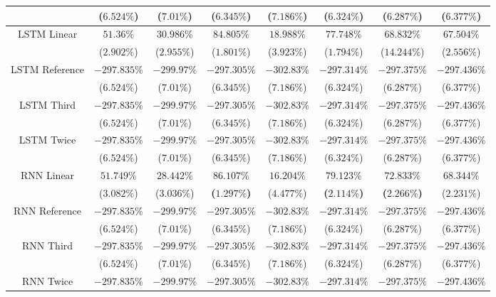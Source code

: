 \begin{table}[!ht]
{\begin{tabular}{|c|c|c|c|c|c|c|c|}
			 & ($6.524\%$) & ($7.01\%$) & ($6.345\%$) & ($7.186\%$) & ($6.324\%$) & ($6.287\%$) & ($6.377\%$) \\ \hline
			\multirow{2}{*}{LSTM Linear} & $51.36\%$ & $30.986\%$ & $84.805\%$ & $18.988\%$ & $77.748\%$ & $68.832\%$ & $67.504\%$ \\
			 & ($2.902\%$) & ($2.955\%$) & ($1.801\%$) & ($3.923\%$) & ($1.794\%$) & ($14.244\%$) & ($2.556\%$) \\ \hline
			\multirow{2}{*}{LSTM Reference} & $-297.835\%$ & $-299.97\%$ & $-297.305\%$ & $-302.83\%$ & $-297.314\%$ & $-297.375\%$ & $-297.436\%$ \\
			 & ($6.524\%$) & ($7.01\%$) & ($6.345\%$) & ($7.186\%$) & ($6.324\%$) & ($6.287\%$) & ($6.377\%$) \\ \hline
			\multirow{2}{*}{LSTM Third} & $-297.835\%$ & $-299.97\%$ & $-297.305\%$ & $-302.83\%$ & $-297.314\%$ & $-297.375\%$ & $-297.436\%$ \\
			 & ($6.524\%$) & ($7.01\%$) & ($6.345\%$) & ($7.186\%$) & ($6.324\%$) & ($6.287\%$) & ($6.377\%$) \\ \hline
			\multirow{2}{*}{LSTM Twice} & $-297.835\%$ & $-299.97\%$ & $-297.305\%$ & $-302.83\%$ & $-297.314\%$ & $-297.375\%$ & $-297.436\%$ \\
			 & ($6.524\%$) & ($7.01\%$) & ($6.345\%$) & ($7.186\%$) & ($6.324\%$) & ($6.287\%$) & ($6.377\%$) \\ \hline
			\multirow{2}{*}{RNN Linear} & $51.749\%$ & $28.442\%$ & $\mathbf{86.107\%}$ & $16.204\%$ & $\mathbf{79.123\%}$ & $\mathbf{72.833\%}$ & $68.344\%$ \\
			 & ($3.082\%$) & ($3.036\%$) & \textbf{(}$\mathbf{1.297\%}$\textbf{)} & ($4.477\%$) & \textbf{(}$\mathbf{2.114\%}$\textbf{)} & \textbf{(}$\mathbf{2.266\%}$\textbf{)} & ($2.231\%$) \\ \hline
			\multirow{2}{*}{RNN Reference} & $-297.835\%$ & $-299.97\%$ & $-297.305\%$ & $-302.83\%$ & $-297.314\%$ & $-297.375\%$ & $-297.436\%$ \\
			 & ($6.524\%$) & ($7.01\%$) & ($6.345\%$) & ($7.186\%$) & ($6.324\%$) & ($6.287\%$) & ($6.377\%$) \\ \hline
			\multirow{2}{*}{RNN Third} & $-297.835\%$ & $-299.97\%$ & $-297.305\%$ & $-302.83\%$ & $-297.314\%$ & $-297.375\%$ & $-297.436\%$ \\
			 & ($6.524\%$) & ($7.01\%$) & ($6.345\%$) & ($7.186\%$) & ($6.324\%$) & ($6.287\%$) & ($6.377\%$) \\ \hline
			\multirow{2}{*}{RNN Twice} & $-297.835\%$ & $-299.97\%$ & $-297.305\%$ & $-302.83\%$ & $-297.314\%$ & $-297.375\%$ & $-297.436\%$ \\

\end{tabular}}
\end{table}
